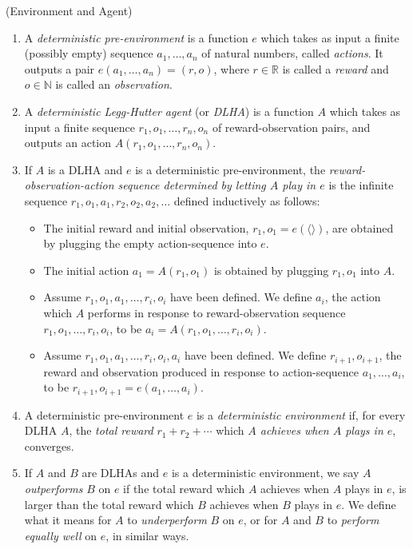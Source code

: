 \documentclass[twoside,11pt]{article}
\begin{document}
\begin{definition}
\label{EnvironmentAndAgent}
    (Environment and Agent)
    \begin{enumerate}
        \item
        A \emph{deterministic pre-environment} is a function $e$ which takes as input a finite
        (possibly empty) sequence
        $a_1,\ldots,a_n$ of
        natural numbers, called \emph{actions}. It outputs a pair 
        $e(a_1,\ldots,a_n)=(r,o)$, where $r\in\mathbb R$ is called a \emph{reward}
        and $o\in\mathbb N$ is called an \emph{observation}.
        \item
        A \emph{deterministic Legg-Hutter agent} (or \emph{DLHA}) is
        a function $A$ which takes as input a finite sequence
        $r_1,o_1,\ldots,r_n,o_n$ of reward-observation pairs, and outputs an action
        $A(r_1,o_1,\ldots,r_n,o_n)$.
        \item
        If $A$ is a DLHA and $e$ is a deterministic pre-environment,
        the \emph{reward-observation-action sequence
        determined by letting $A$ play in $e$} is the infinite sequence
        $r_1,o_1,a_1,r_2,o_2,a_2,\ldots$ defined inductively as follows:
        \begin{itemize}
            \item
            The initial reward and initial observation,
            $r_1,o_1=e(\langle\rangle)$, are obtained by plugging the empty
            action-sequence into $e$.
            \item
            The initial action
            $a_1=A(r_1,o_1)$ is obtained by plugging $r_1,o_1$ into $A$.
            \item
            Assume $r_1,o_1,a_1,\ldots,r_i,o_i$ have been defined.
            We define $a_i$,
            the action which $A$ performs
            in response to reward-observation sequence $r_1,o_1,\ldots,r_i,o_i$,
            to be $a_i=A(r_1,o_1,\ldots,r_i,o_i)$.
            \item
            Assume $r_1,o_1,a_1,\ldots,r_i,o_i,a_i$ have been defined.
            We define $r_{i+1},o_{i+1}$, the reward and observation
            produced in response to action-sequence $a_1,\ldots,a_i$,
            to be $r_{i+1},o_{i+1}=e(a_1,\ldots,a_i)$.
        \end{itemize}
        \item
        A deterministic pre-environment $e$ is a \emph{deterministic environment} if,
        for every DLHA $A$, the \emph{total reward} $r_1+r_2+\cdots$
        which \emph{$A$ achieves
        when $A$ plays in $e$}, converges.
        \item
        If $A$ and $B$ are DLHAs and $e$ is a deterministic environment, we
        say $A$ \emph{outperforms}
        $B$ on $e$ if the total reward which $A$ achieves when $A$ plays in $e$, is larger than
        the total reward which $B$ achieves when $B$ plays in $e$.
        We define what it means for
        $A$ to \emph{underperform} $B$ on $e$, or for $A$ and $B$
        to \emph{perform equally well}
        on $e$, in similar ways.
    \end{enumerate}
\end{definition}
\end{document}
